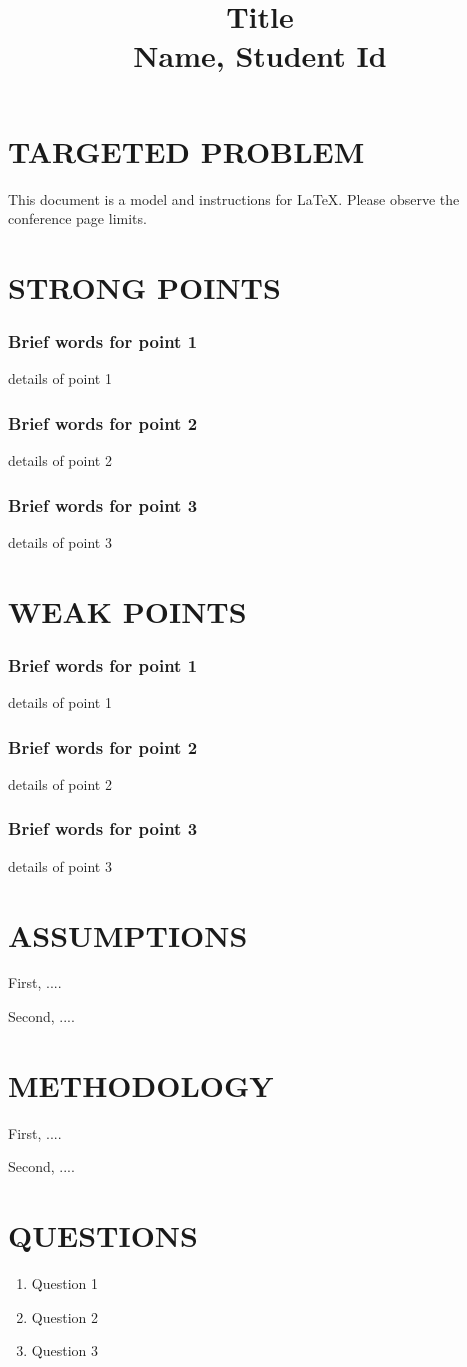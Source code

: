 \documentclass[conference]{IEEEtran}
\begin{document}
\title{Title\\
{\small Name, Student Id}
}

\maketitle

\section{TARGETED PROBLEM}
This document is a model and instructions for \LaTeX.
Please observe the conference page limits. 

\section{STRONG POINTS}
\subsubsection{Brief words for point 1} details of point 1
\subsubsection{Brief words for point 2} details of point 2
\subsubsection{Brief words for point 3} details of point 3

\section{WEAK POINTS}
\subsubsection{Brief words for point 1} details of point 1
\subsubsection{Brief words for point 2} details of point 2
\subsubsection{Brief words for point 3} details of point 3

\section{ASSUMPTIONS}

First, ....

Second, ....

\section{METHODOLOGY}

First, ....

Second, ....

\section{QUESTIONS}

\begin{enumerate}
    \item Question 1
    \item Question 2
    \item Question 3
\end{enumerate}
\end{document}
